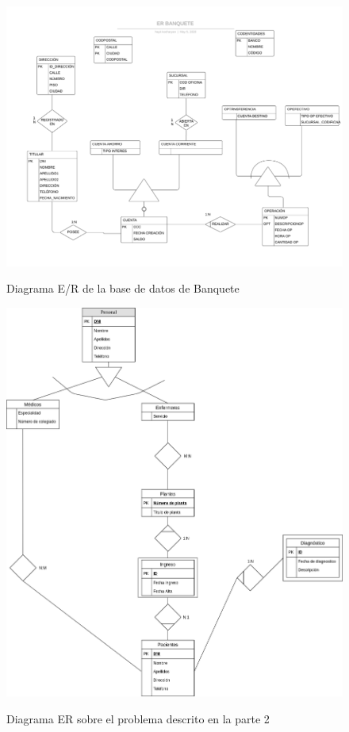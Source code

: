 \documentclass{article}
\begin{document}
\begin{landscape}
\begin{figure}
\centering
\includegraphics[scale=0.75]{images/ER_BANQUETE.jpeg}
\label{fig:er_banquete}
\caption{Diagrama E/R de la base de datos de Banquete}
\end{figure}
\end{landscape}



\begin{figure}
\centering
\includegraphics[scale=0.5]{images/er_parte2_2.png}
\label{fig:er_parte2_2}
\caption{Diagrama ER sobre el problema descrito en la parte 2}
\end{figure}
\end{document}
